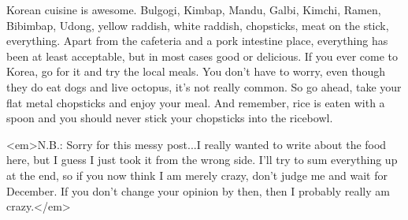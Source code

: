 \begin{post}
\begin{content}
Korean cuisine is awesome. Bulgogi, Kimbap, Mandu, Galbi, Kimchi, Ramen, Bibimbap, Udong, yellow raddish, white raddish, chopsticks, meat on the stick, everything. Apart from the cafeteria and a pork intestine place, everything has been at least acceptable, but in most cases good or delicious. If you ever come to Korea, go for it and try the local meals. You don't have to worry, even though they do eat dogs and live octopus, it's not really common. So go ahead, take your flat metal chopsticks and enjoy your meal. And remember, rice is eaten with a spoon and you should never stick your chopsticks into the ricebowl.

<em>N.B.: Sorry for this messy post...I really wanted to write about the food here, but I guess I just took it from the wrong side. I'll try to sum everything up at the end, so if you now think I am merely crazy, don't judge me and wait for December. If you don't change your opinion by then, then I probably really am crazy.</em>
	\end{content}
\end{post}
